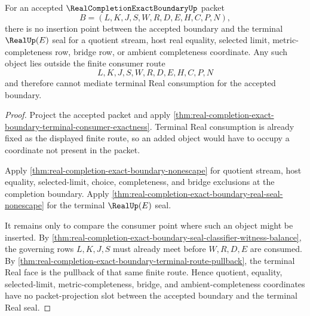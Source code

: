 \begin{theorem}
\label{thm:real-completion-exact-boundary-no-completeness-escape}
For an accepted $\RealCompletionExactBoundaryUp$ packet
$$
B=(L,K,J,S,W,R,D,E,H,C,P,N),
$$
there is no insertion point between the accepted boundary and the terminal $\RealUp(E)$ seal for a quotient stream, host real equality, selected limit, metric-completeness row, bridge row, or ambient completeness coordinate. Any such object lies outside the finite consumer route
$$
L,K,J,S,W,R,D,E,H,C,P,N
$$
and therefore cannot mediate terminal Real consumption for the accepted boundary.
\end{theorem}
\begin{proof}
Project the accepted packet and apply \autoref{thm:real-completion-exact-boundary-terminal-consumer-exactness}. Terminal Real consumption is already fixed as the displayed finite route, so an added object would have to occupy a coordinate not present in the packet.

Apply \autoref{thm:real-completion-exact-boundary-nonescape} for quotient stream, host equality, selected-limit, choice, completeness, and bridge exclusions at the completion boundary. Apply \autoref{thm:real-completion-exact-boundary-real-seal-nonescape} for the terminal $\RealUp(E)$ seal.

It remains only to compare the consumer point where such an object might be inserted. By \autoref{thm:real-completion-exact-boundary-seal-classifier-witness-balance}, the governing rows $L,K,J,S$ must already meet before $W,R,D,E$ are consumed. By \autoref{thm:real-completion-exact-boundary-terminal-route-pullback}, the terminal Real face is the pullback of that same finite route. Hence quotient, equality, selected-limit, metric-completeness, bridge, and ambient-completeness coordinates have no packet-projection slot between the accepted boundary and the terminal Real seal.
\end{proof}

